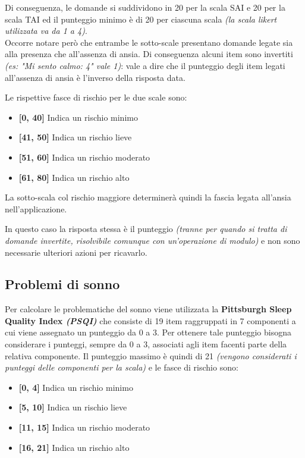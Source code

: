 Di conseguenza, le domande si suddividono in 20 per la scala SAI e 20 per la scala TAI ed il punteggio minimo è di 20 per ciascuna scala \textit{(la scala likert utilizzata va da 1 a 4)}.\\
Occorre notare però che entrambe le sotto-scale presentano domande legate sia alla presenza che all'assenza di ansia. Di conseguenza alcuni item sono invertiti \textit{(es: "Mi sento calmo: 4" vale 1)}: vale a dire che il punteggio degli item legati all'assenza di ansia è l'inverso della risposta data.

Le rispettive fasce di rischio per le due scale sono:
\begin{itemize}
\item \textbf{[0, 40]} Indica un rischio minimo
\item \textbf{[41, 50]} Indica un rischio lieve
\item \textbf{[51, 60]} Indica un rischio moderato
\item \textbf{[61, 80]} Indica un rischio alto
\end{itemize}

La sotto-scala col rischio maggiore determinerà quindi la fascia legata all'ansia nell'applicazione.

In questo caso la risposta stessa è il punteggio \textit{(tranne per quando si tratta di domande invertite, risolvibile comunque con un'operazione di modulo)} e non sono necessarie ulteriori azioni per ricavarlo.

\newpage
\subsection{Problemi di sonno}
Per calcolare le problematiche del sonno viene utilizzata la \textbf{Pittsburgh Sleep Quality Index \textit{(PSQI)}}\cite{PSQI} che consiste di 19 item raggruppati in 7 componenti a cui viene assegnato un punteggio da 0 a 3. Per ottenere tale punteggio bisogna considerare i punteggi, sempre da 0 a 3, associati agli item facenti parte della relativa componente. Il punteggio massimo è quindi di 21 \textit{(vengono considerati i punteggi delle componenti per la scala)} e le fasce di rischio sono:
\begin{itemize}
\item \textbf{[0, 4]} Indica un rischio minimo
\item \textbf{[5, 10]} Indica un rischio lieve
\item \textbf{[11, 15]} Indica un rischio moderato
\item \textbf{[16, 21]} Indica un rischio alto
\end{itemize}

